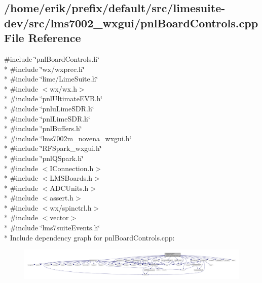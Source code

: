 \subsection{/home/erik/prefix/default/src/limesuite-\/dev/src/lms7002\+\_\+wxgui/pnl\+Board\+Controls.cpp File Reference}
\label{pnlBoardControls_8cpp}
{\ttfamily \#include \char`\"{}pnl\+Board\+Controls.\+h\char`\"{}}\\*
{\ttfamily \#include \char`\"{}wx/wxprec.\+h\char`\"{}}\\*
{\ttfamily \#include \char`\"{}lime/\+Lime\+Suite.\+h\char`\"{}}\\*
{\ttfamily \#include $<$wx/wx.\+h$>$}\\*
{\ttfamily \#include \char`\"{}pnl\+Ultimate\+E\+V\+B.\+h\char`\"{}}\\*
{\ttfamily \#include \char`\"{}pnlu\+Lime\+S\+D\+R.\+h\char`\"{}}\\*
{\ttfamily \#include \char`\"{}pnl\+Lime\+S\+D\+R.\+h\char`\"{}}\\*
{\ttfamily \#include \char`\"{}pnl\+Buffers.\+h\char`\"{}}\\*
{\ttfamily \#include \char`\"{}lms7002m\+\_\+novena\+\_\+wxgui.\+h\char`\"{}}\\*
{\ttfamily \#include \char`\"{}R\+F\+Spark\+\_\+wxgui.\+h\char`\"{}}\\*
{\ttfamily \#include \char`\"{}pnl\+Q\+Spark.\+h\char`\"{}}\\*
{\ttfamily \#include $<$I\+Connection.\+h$>$}\\*
{\ttfamily \#include $<$L\+M\+S\+Boards.\+h$>$}\\*
{\ttfamily \#include $<$A\+D\+C\+Units.\+h$>$}\\*
{\ttfamily \#include $<$assert.\+h$>$}\\*
{\ttfamily \#include $<$wx/spinctrl.\+h$>$}\\*
{\ttfamily \#include $<$vector$>$}\\*
{\ttfamily \#include \char`\"{}lms7suite\+Events.\+h\char`\"{}}\\*
Include dependency graph for pnl\+Board\+Controls.\+cpp\+:
\nopagebreak
\begin{figure}[H]
\begin{center}
\leavevmode
\includegraphics[width=350pt]{dd/d02/pnlBoardControls_8cpp__incl}
\end{center}
\end{figure}
